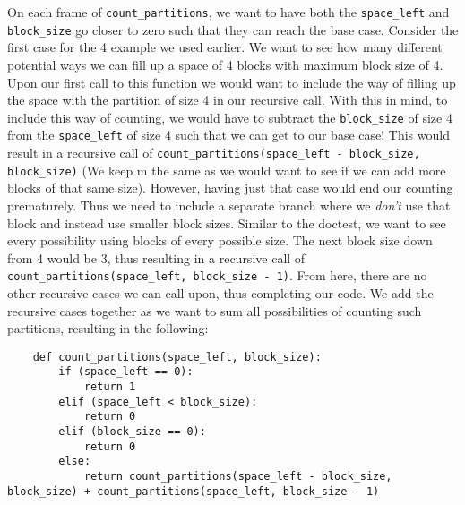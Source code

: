 \clearpage
\begin{blocksection}
On each frame of \lstinline{count_partitions}, we want to have both the \lstinline{space_left} and \lstinline{block_size} go closer to zero such that they can reach the base case.
\newline
\newline
Consider the first case for the 4 example we used earlier. We want to see how many different potential ways we can fill up a space of 4 blocks with maximum block size of 4. Upon our first call to this function we would want to include the way of filling up the space with the partition of size 4 in our recursive call.
With this in mind, to include this way of counting, we would have to subtract the \lstinline{block_size} of size 4 from the \lstinline{space_left} of size 4 such that we can get to our base case! This would result in a recursive call of \lstinline{count_partitions(space_left - block_size, block_size)} (We keep m the same as we would want to see if we can add more blocks of that same size). However, having just that case would end our counting prematurely. Thus we need to include a separate branch where we \textit{don't} use that block and instead use smaller block sizes.
\newline
\newline
Similar to the doctest, we want to see every possibility using blocks of every possible size. The next block size down from 4 would be 3, thus resulting in a recursive call of \lstinline{count_partitions(space_left, block_size - 1)}. From here, there are no other recursive cases we can call upon, thus completing our code. We add the recursive cases together as we want to sum all possibilities of counting such partitions, resulting in the following:
\begin{lstlisting}
    def count_partitions(space_left, block_size):
        if (space_left == 0):
            return 1
        elif (space_left < block_size):
            return 0
        elif (block_size == 0):
            return 0
        else:
            return count_partitions(space_left - block_size, block_size) + count_partitions(space_left, block_size - 1)
\end{lstlisting}
\end{blocksection}

